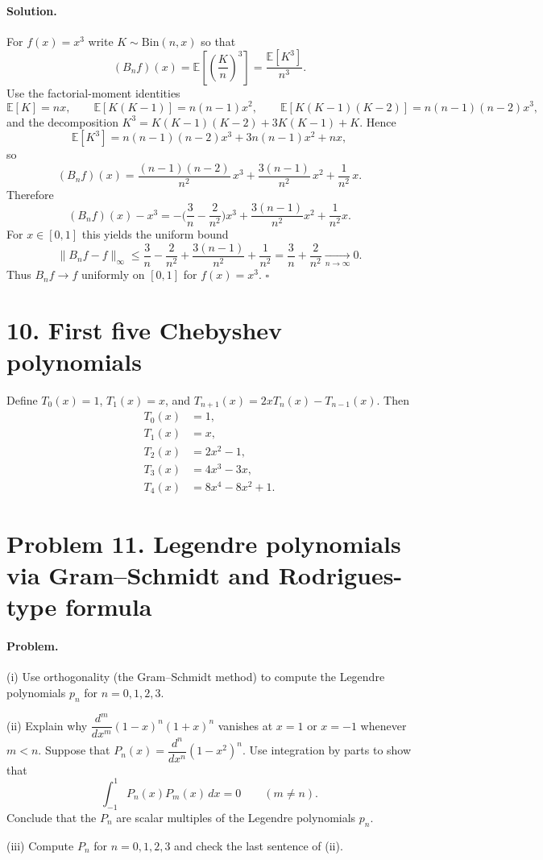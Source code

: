 \documentclass[12pt,a4paper]{article}
\newcommand{\qed}{\hfill$\square$}
\theoremstyle{plain}
\theoremstyle{definition}
\theoremstyle{remark}
\theoremstyle{remark}
\begin{document}
\paragraph{Solution.}
For $f(x)=x^3$ write $K\sim\mathrm{Bin}(n,x)$ so that
\[
(B_n f)(x)=\mathbb{E}\!\left[\left(\frac{K}{n}\right)^3\right]
=\frac{\mathbb{E}[K^3]}{n^3}.
\]
Use the factorial-moment identities
\[
\mathbb{E}[K]=nx,\qquad
\mathbb{E}[K(K-1)]=n(n-1)x^2,\qquad
\mathbb{E}[K(K-1)(K-2)]=n(n-1)(n-2)x^3,
\]
and the decomposition \(K^3=K(K-1)(K-2)+3K(K-1)+K\). Hence
\[
\mathbb{E}[K^3]=n(n-1)(n-2)x^3+3n(n-1)x^2+nx,
\]
so
\[
(B_n f)(x)=\frac{(n-1)(n-2)}{n^2}\,x^3+\frac{3(n-1)}{n^2}\,x^2+\frac{1}{n^2}\,x.
\]
Therefore
\[
(B_n f)(x)-x^3
= -\Big(\frac{3}{n}-\frac{2}{n^2}\Big)x^3+\frac{3(n-1)}{n^2}x^2+\frac{1}{n^2}x.
\]
For $x\in[0,1]$ this yields the uniform bound
\[
\|B_n f-f\|_\infty
\le \frac{3}{n}-\frac{2}{n^2}+\frac{3(n-1)}{n^2}+\frac{1}{n^2}
= \frac{3}{n}+\frac{2}{n^2}\xrightarrow[n\to\infty]{}0.
\]
Thus $B_n f\to f$ uniformly on $[0,1]$ for $f(x)=x^3$. \qed

\section*{10. First five Chebyshev polynomials}
Define $T_0(x)=1$, $T_1(x)=x$, and $T_{n+1}(x)=2xT_n(x)-T_{n-1}(x)$. Then
\[
\begin{aligned}
	T_0(x)&=1,\\
	T_1(x)&=x,\\
	T_2(x)&=2x^2-1,\\
	T_3(x)&=4x^3-3x,\\
	T_4(x)&=8x^4-8x^2+1.
\end{aligned}
\]
	
\section*{Problem 11. Legendre polynomials via Gram--Schmidt and Rodrigues-type formula}

\paragraph{Problem.}
(i) Use orthogonality (the Gram--Schmidt method) to compute the Legendre polynomials $p_n$ for $n=0,1,2,3$.
\par (ii) Explain why $\dfrac{d^m}{dx^m}(1-x)^n(1+x)^n$ vanishes at $x=1$ or $x=-1$ whenever $m<n$.
Suppose that $P_n(x)=\dfrac{d^n}{dx^n}(1-x^2)^n$. Use integration by parts to show that
\[
\int_{-1}^{1} P_n(x)P_m(x)\,dx=0\qquad(m\ne n).
\]
Conclude that the $P_n$ are scalar multiples of the Legendre polynomials $p_n$.
\par (iii) Compute $P_n$ for $n=0,1,2,3$ and check the last sentence of (ii).
\end{document}
